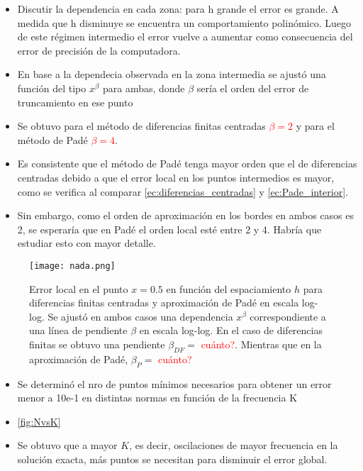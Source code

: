 \documentclass[aps,prb,twocolumn,superscriptaddress,floatfix,longbibliography]{revtex4-2}
\newif\ifptitle
\newif\ifpnumber
\newcounter{para}
\newcommand\ptitle[1]{\par\refstepcounter{para}
{\ifpnumber{\noindent\textcolor{lightgray}{\textbf{\thepara}}\indent}\fi}
{\ifptitle{\textbf{[{#1}]}}\fi}}
\begin{document}
\begin{itemize}
    \item Discutir la dependencia en cada zona: para h grande el error es grande. A medida que h disminuye se encuentra un comportamiento polinómico. Luego de este régimen intermedio el error vuelve a aumentar como consecuencia del error de precisión de la computadora.
    \item En base a la dependecia observada en la zona intermedia se ajustó una función del tipo $x^\beta$ para ambas, donde $\beta$ sería el orden del error de truncamiento en ese punto
    \item Se obtuvo para el método de diferencias finitas centradas \textcolor{red}{$\beta = 2$} y para el método de Padé \textcolor{red}{$\beta = 4$}.
    \item Es consistente que el método de Padé tenga mayor orden que el de diferencias centradas debido a que el error local en los puntos intermedios es mayor, como se verifica al comparar \ref{ec:diferencias_centradas} y \ref{ec:Pade_interior}.
    \item Sin embargo, como el orden de aproximación en los bordes en ambos casos es 2, se esperaría que en Padé el orden local esté entre 2 y 4. Habría que estudiar esto con mayor detalle.
\end{itemize}

\begin{figure}[h]
    \texttt{[image: nada.png]}
    \caption{Error local en el punto $x = 0.5$ en función del espaciamiento $h$ para diferencias finitas centradas y aproximación de Padé en escala log-log. Se ajustó en ambos casos una dependencia $x^\beta$ correspondiente a una línea de pendiente $\beta$ en escala log-log. En el caso de diferencias finitas se obtuvo una pendiente $\beta_{DF} = $ \textcolor{red}{cuánto?}. Mientras que en la aproximación de Padé, $\beta_P = $ \textcolor{red}{cuánto?} }
     \label{fig:error_local_0.5}
\end{figure}

\ptitle{Se determinó el nro de puntos mínimos necesarios para obtener un error menor a $10e-1$ en distintas normas en función de la frecuencia K}

\begin{itemize}
    \item Se determinó el nro de puntos mínimos necesarios para obtener un error menor a 10e-1 en distintas normas en función de la frecuencia K
    \item \ref{fig:NvsK}
    \item Se obtuvo que a mayor $K$, es decir, oscilaciones de mayor frecuencia en la solución exacta, más puntos se necesitan para disminuir el error global.
\end{itemize}
\end{document}
